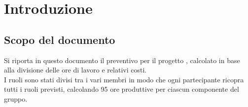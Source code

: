 \section{Introduzione}
\subsection{Scopo del documento}
Si riporta in questo documento il preventivo per il progetto \capName, calcolato in base alla divisione delle ore di lavoro e relativi costi. \\
I ruoli sono stati divisi tra i vari membri in modo che ogni partecipante ricopra tutti i ruoli previsti, calcolando 95 ore produttive per ciascun componente del gruppo.
